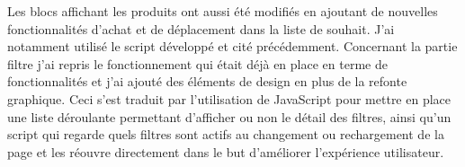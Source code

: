 \documentclass[a4paper,11pt,twoside]{report}
\begin{document}
	Les blocs affichant les produits ont aussi été modifiés en ajoutant de nouvelles fonctionnalités d'achat et de déplacement dans la liste de souhait. J'ai notamment utilisé le script développé et cité précédemment. 
	Concernant la partie filtre j'ai repris le fonctionnement qui était déjà en place en terme de fonctionnalités et j'ai ajouté des éléments de design en plus de la refonte graphique. Ceci s'est traduit par l'utilisation de JavaScript pour mettre en place une liste déroulante permettant d'afficher ou non le détail des filtres, ainsi qu'un script qui regarde quels filtres sont actifs au changement ou rechargement de la page et les réouvre directement dans le but d'améliorer l'expérience utilisateur. 
	\label{script_accordion_active}
	
\end{document}
